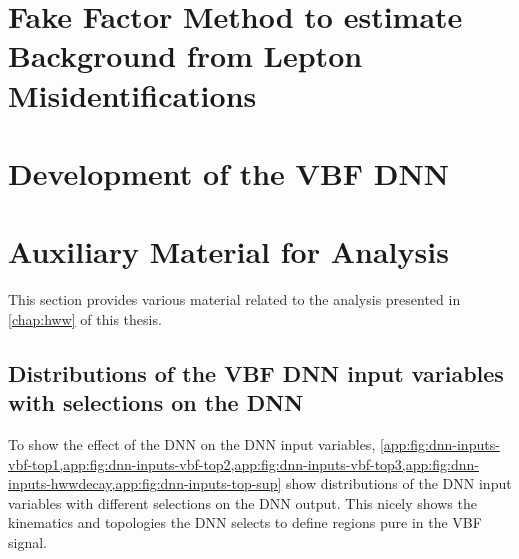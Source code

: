 \chapter[Fake Factor Method]{Fake Factor Method to estimate Background from Lepton Misidentifications}
\label{app:fake-factor-method}


\FloatBarrier
\chapter{Development of the VBF DNN}
\label{app:chap:DNN}


\FloatBarrier
\chapter{Auxiliary Material for \HWW Analysis}
This section provides various material related to the \HWW analysis presented in \cref{chap:hww} of this thesis.

\clearpage
\FloatBarrier
\section[Distributions of the VBF DNN input variables]{Distributions of the VBF DNN input variables with selections on the DNN}
\label{app:dnn:input-vars}
To show the effect of the DNN on the DNN input variables, \cref{app:fig:dnn-inputs-vbf-top1,app:fig:dnn-inputs-vbf-top2,app:fig:dnn-inputs-vbf-top3,app:fig:dnn-inputs-hwwdecay,app:fig:dnn-inputs-top-sup} show distributions of the DNN input variables with different selections on the DNN output.
This nicely shows the kinematics and topologies the DNN selects to define regions pure in the VBF signal.

